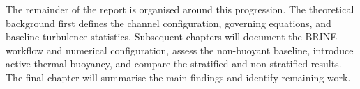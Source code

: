 The remainder of the report is organised around this progression. The
theoretical background first defines the channel configuration, governing
equations, and baseline turbulence statistics. Subsequent chapters will
document the BRINE workflow and numerical configuration, assess the
non-buoyant baseline, introduce active thermal buoyancy, and compare the
stratified and non-stratified results. The final chapter will summarise the
main findings and identify remaining work.
